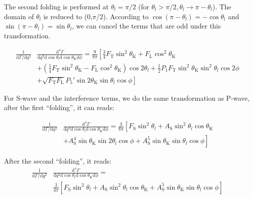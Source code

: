 The second folding is performed at $\theta_l = \pi/2$ (for
$\theta_l>\pi/2,\theta_l\rightarrow \pi- \theta_l$). The domain of
$\theta_l$ is reduced to (0,$\pi$/2). According to $\cos(\pi-\theta_l) = -
\cos\theta_l$ and $\sin(\pi-\theta_l) = \sin\theta_l$, we can cancel the terms that are odd under this transformation.


\begin{equation} \label{eq:fold2}
    \begin{split}
        \frac{1}{\mathrm{d}\Gamma/\mathrm{d}q^2}&\frac{\mathrm{d}^4\Gamma}{\mathrm{d}q^2 \mathrm{d}\cos\theta_l \mathrm{d}\cos\theta_\mathrm{K} \mathrm{d}\phi} = \frac{9}{8\pi}\left[\frac{3}{4}F_\mathrm{T}\sin^2\theta_\mathrm{K} + F_\mathrm{L}\cos^2\theta_\mathrm{K} \right.\\
            &\left.+(\frac{1}{4}F_\mathrm{T}\sin^2\theta_\mathrm{K}-F_\mathrm{L}\cos^2\theta_\mathrm{K})\cos2\theta_l+\frac{1}{2}P_1F_\mathrm{T}\sin^2\theta_\mathrm{K}\sin^2\theta_l\cos 2\phi \right.\\
            &\left.+\sqrt{F_\mathrm{T}F_\mathrm{L}}P_5'\sin2\theta_\mathrm{K}\sin\theta_l\cos\phi  \right]
    \end{split}
\end{equation}

 For S-wave and the
interference terms, we do the same transformation as P-wave, after the
first ``folding'', it can reads:

\begin{equation} \label{eq:S-fold1}
    \begin{split}
        \frac{1}{\mathrm{d}\Gamma/\mathrm{d}q^2}&\frac{\mathrm{d}^4\Gamma}{\mathrm{d}q^2 \mathrm{d}\cos\theta_l \mathrm{d}\cos\theta_\mathrm{K} \mathrm{d}\phi} = \frac{3}{8\pi}\left[F_\mathrm{S}\sin^2\theta_l+ A_\mathrm{S}\sin^2\theta_l\cos\theta_\mathrm{K}\right.\\
            &+\left. A_\mathrm{S}^4\sin\theta_\mathrm{K}\sin2\theta_l\cos\phi + A^5_\mathrm{S}\sin\theta_\mathrm{K}\sin\theta_l\cos\phi\right]
    \end{split}
\end{equation}

After the second ``folding'', it reads:
\begin{equation} \label{eq:S-fold2}
    \begin{split}
      \frac{1}{\mathrm{d}\Gamma/\mathrm{d}q^2}&\frac{\mathrm{d}^4\Gamma}{\mathrm{d}q^2 \mathrm{d}\cos\theta_l \mathrm{d}\cos\theta_\mathrm{K} \mathrm{d}\phi} = \\
      &\frac{3}{4\pi}\left[F_\mathrm{S}\sin^2\theta_l+A_\mathrm{S}\sin^2\theta_l\cos\theta_\mathrm{K}+A^5_\mathrm{S}\sin\theta_\mathrm{K}\sin\theta_l\cos\phi\right]
    \end{split}
\end{equation}

